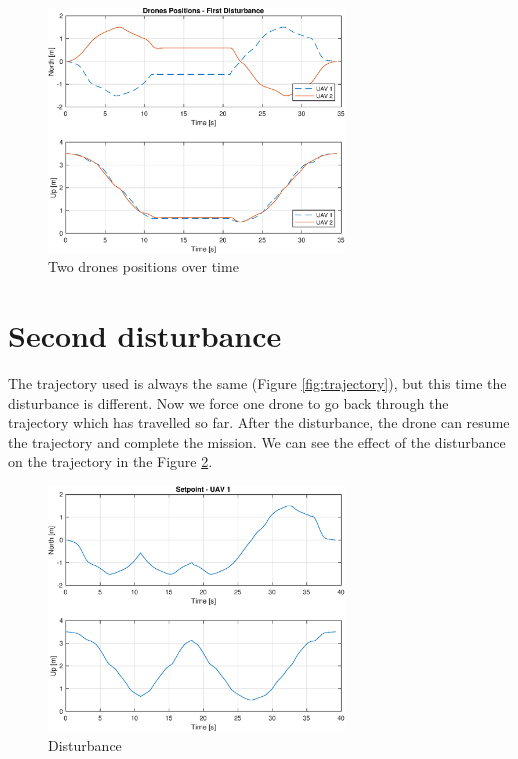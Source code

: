 \begin{figure}
\centering
\includegraphics[width=0.7\textwidth]{chapters/chapter-04/figures/overlapped_1.eps}
\caption{Two drones positions over time}
\label{fig:overlapped_1}
\end{figure}


\section{Second disturbance}
The trajectory used is always the same (Figure \ref{fig:trajectory}), but this time
the disturbance is different. Now we force one drone to go back through the trajectory
which has travelled so far.
After the disturbance, the drone can resume the trajectory and complete the mission.
We can see the effect of the disturbance on the trajectory in the Figure \ref{fig:disturbance_2}.

\begin{figure}
\centering
\includegraphics[width=0.7\textwidth]{chapters/chapter-04/figures/pos_2.eps}
\caption{Disturbance}
\label{fig:disturbance_2}
\end{figure}

